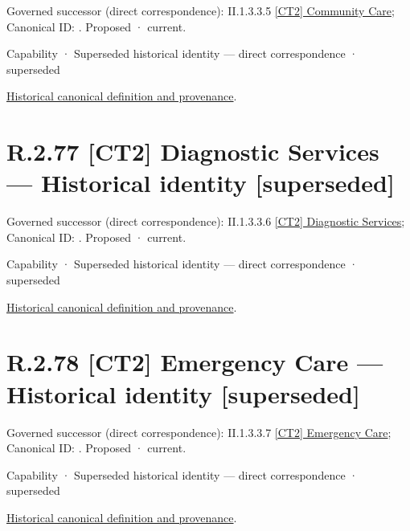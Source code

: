 {\small Governed successor (direct correspondence): II.1.3.3.5 \hyperref[element:942aa78cad004ef99de6b3aae8ddd014]{[CT2] Community Care}; Canonical ID: \texttt{}. Proposed · current.}\par
\label{element:4b7177f3f40449518fba381acae6ba1e}
{\small Capability · Superseded historical identity — direct correspondence · superseded}\par
\href{../../../../continuum/strategy/capability/4b7177f3f40449518fba381acae6ba1e.md}{Historical canonical definition and provenance}.\par
\section*{R.2.77 [CT2] Diagnostic Services — Historical identity [superseded]}
\label{navigation:R.2.77}

{\small Governed successor (direct correspondence): II.1.3.3.6 \hyperref[element:b825ebab42f444d8b738b4c1f489f785]{[CT2] Diagnostic Services}; Canonical ID: \texttt{}. Proposed · current.}\par
\label{element:03a57e0c9ea34f7fb7b78e5f5c85379f}
{\small Capability · Superseded historical identity — direct correspondence · superseded}\par
\href{../../../../continuum/strategy/capability/03a57e0c9ea34f7fb7b78e5f5c85379f.md}{Historical canonical definition and provenance}.\par
\section*{R.2.78 [CT2] Emergency Care — Historical identity [superseded]}
\label{navigation:R.2.78}

{\small Governed successor (direct correspondence): II.1.3.3.7 \hyperref[element:aa088f0647ad4b78966fe28fa80af674]{[CT2] Emergency Care}; Canonical ID: \texttt{}. Proposed · current.}\par
\label{element:e5edbb54258c490aaba0816d980dc624}
{\small Capability · Superseded historical identity — direct correspondence · superseded}\par
\href{../../../../continuum/strategy/capability/e5edbb54258c490aaba0816d980dc624.md}{Historical canonical definition and provenance}.\par
